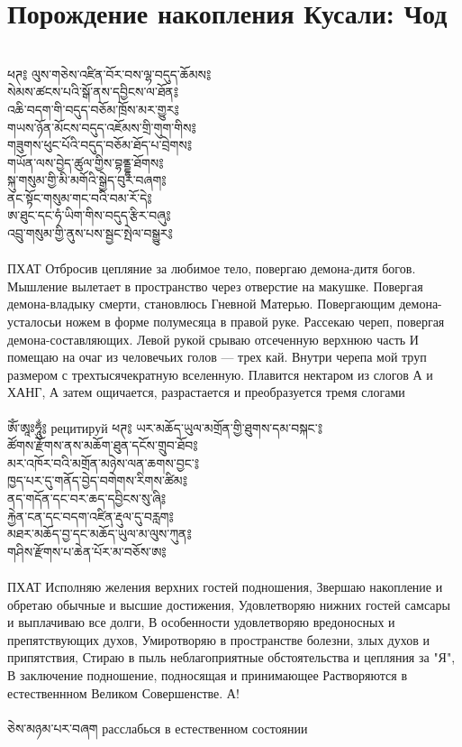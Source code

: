 \ru
\section{Порождение накопления Кусали: Чод}
\\
\ti
ཕཊ༔ ལུས་གཅེས་འཛིན་བོར་བས་ལྷ་བདུད་ཆོམས༔\\
སེམས་ཚངས་པའི་སྒོ་ནས་དབྱིངས་ལ་ཐོན༔\\
འཆི་བདག་གི་བདུད་བཅོམ་ཁྲོས་མར་གྱུར༔\\
གཡས་ཉོན་མོངས་བདུད་འཇོམས་གྲི་གུག་གིས༔\\
གཟུགས་ཕུང་པོའི་བདུད་བཅོམ་ཐོད་པ་བྲེགས༔\\
གཡོན་ལས་བྱེད་ཚུལ་གྱིས་བྷནྡྷ་ཐོགས༔\\
སྐུ་གསུམ་གྱི་མི་མགོའི་སྒྱེད་བུར་བཞག༔\\
ནང་སྟོང་གསུམ་གང་བའི་བམ་རོ་དེ༔\\
ཨ་ཐུང་དང་ཧཾ་ཡིག་གིས་བདུད་རྩིར་བཞུ༔\\
འབྲུ་གསུམ་གྱི་ནུས་པས་སྦྱང་སྤེལ་བསྒྱུར༔\\
\\
\ru
ПХАТ Отбросив цепляние за любимое тело, повергаю демона-дитя богов.
Мышление вылетает в пространство через отверстие на макушке.
Повергая демона-владыку смерти, становлюсь Гневной Матерью.
Повергающим демона-усталосьи ножем в форме полумесяца в правой руке.
Рассекаю череп, повергая демона-составляющих.
Левой рукой срываю отсеченную верхнюю часть
И помещаю на очаг из человечьих голов — трех кай.
Внутри черепа мой труп размером с трехтысячекратную вселенную.
Плавится нектаром из слогов А и ХАНГ,
А затем ощичается, разрастается и преобразуется тремя слогами\\
\\
\ti
ཨོཾ་ཨཱཿཧཱུྂ༔
\ru рецитируй
\newpage
\ti
ཕཊ༔ ཡར་མཆོད་ཡུལ་མགྲོན་གྱི་ཐུགས་དམ་བསྐང་༔\\
ཚོགས་རྫོགས་ནས་མཆོག་ཐུན་དངོས་གྲུབ་ཐོབ༔\\
མར་འཁོར་བའི་མགྲོན་མཉེས་ལན་ཆགས་བྱང་༔\\
ཁྱད་པར་དུ་གནོད་བྱེད་བགེགས་རིགས་ཚིམ༔\\
ནད་གདོན་དང་བར་ཆད་དབྱིངས་སུ་ཞི༔\\
རྐྱེན་ངན་དང་བདག་འཛིན་རྡུལ་དུ་བརླག༔\\
མཐར་མཆོད་བྱ་དང་མཆོད་ཡུལ་མ་ལུས་ཀུན༔\\
གཤིས་རྫོགས་པ་ཆེན་པོར་མ་བཅོས་ཨ༔\\
\\
\ru
ПХАТ Исполняю желения верхних гостей подношения,
Звершаю накопление и обретаю обычные и высшие достижения,
Удовлетворяю нижних гостей самсары и выплачиваю все долги,
В особенности удовлетворяю вредоносных и препятствующих духов,
Умиротворяю в пространстве болезни, злых духов и припятствия,
Стираю в пыль неблагоприятные обстоятельства и цепляния за "Я",
В заключение подношение, подносящая и принимающее
Растворяются в естественнном Великом Совершенстве. А!\\
\\
\ti
ཅེས་མཉམ་པར་བཞག \ru расслабься в естественном состоянии
